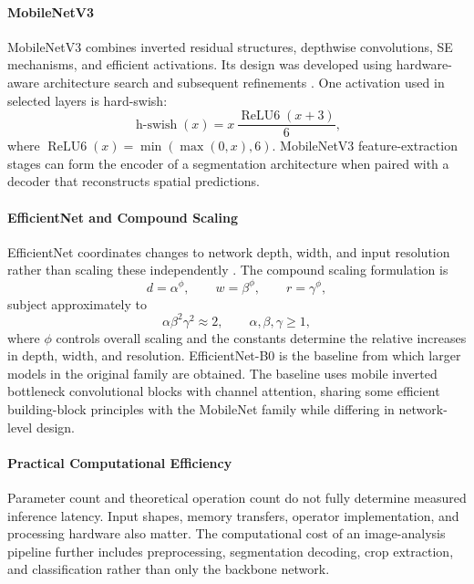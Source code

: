 \paragraph{MobileNetV3}
MobileNetV3 combines inverted residual structures, depthwise convolutions, SE mechanisms, and efficient activations. Its design was developed using hardware-aware architecture search and subsequent refinements \autocite{howard2019mobilenetv3}. One activation used in selected layers is hard-swish:
\begin{equation}
\operatorname{h\mbox{-}swish}(x)=x\,\frac{\operatorname{ReLU6}(x+3)}{6},
\end{equation}
where $\operatorname{ReLU6}(x)=\min(\max(0,x),6)$. MobileNetV3 feature-extraction stages can form the encoder of a segmentation architecture when paired with a decoder that reconstructs spatial predictions.

\paragraph{EfficientNet and Compound Scaling}
EfficientNet coordinates changes to network depth, width, and input resolution rather than scaling these independently \autocite{tan2019efficientnet}. The compound scaling formulation is
\begin{equation}
d=\alpha^\phi,\qquad w=\beta^\phi,\qquad r=\gamma^\phi,
\end{equation}
subject approximately to
\begin{equation}
\alpha\beta^2\gamma^2\approx2,\qquad \alpha,\beta,\gamma\geq1,
\end{equation}
where $\phi$ controls overall scaling and the constants determine the relative increases in depth, width, and resolution. EfficientNet-B0 is the baseline from which larger models in the original family are obtained. The baseline uses mobile inverted bottleneck convolutional blocks with channel attention, sharing some efficient building-block principles with the MobileNet family while differing in network-level design.

\paragraph{Practical Computational Efficiency}
Parameter count and theoretical operation count do not fully determine measured inference latency. Input shapes, memory transfers, operator implementation, and processing hardware also matter. The computational cost of an image-analysis pipeline further includes preprocessing, segmentation decoding, crop extraction, and classification rather than only the backbone network.

